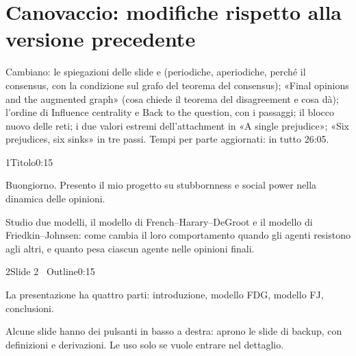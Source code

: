 \section*{Canovaccio: modifiche rispetto alla versione precedente}
Cambiano: le spiegazioni delle slide  e  (periodiche, aperiodiche, perché il consensus, con la condizione sul grafo del teorema del consensus); «Final opinions and the augmented graph» (cosa chiede il teorema del disagreement e cosa dà); l'ordine di Influence centrality e Back to the question, con i passaggi; il blocco nuovo delle reti; i due valori estremi dell'attachment in «A single prejudice»; «Six prejudices, six sinks» in tre passi. Tempi per parte aggiornati: in tutto 26:05.
\begin{slidepag}{1}{Titolo}{0:15}
  \begin{discorso}
    \item Buongiorno. Presento il mio progetto su stubbornness e social power nella dinamica delle opinioni.
    \item Studio due modelli, il modello di French–Harary–DeGroot e il modello di Friedkin–Johnsen: come cambia il loro comportamento quando gli agenti resistono agli altri, e quanto pesa ciascun agente nelle opinioni finali.
  \end{discorso}
\end{slidepag}

\begin{slidepag}{2}{Slide 2 \textperiodcentered\ Outline}{0:15}
  \begin{discorso}
    \item La presentazione ha quattro parti: introduzione, modello FDG, modello FJ, conclusioni.
    \item Alcune slide hanno dei pulsanti in basso a destra: aprono le slide di backup, con definizioni e derivazioni. Le uso solo se vuole entrare nel dettaglio.
  \end{discorso}
\end{slidepag}

